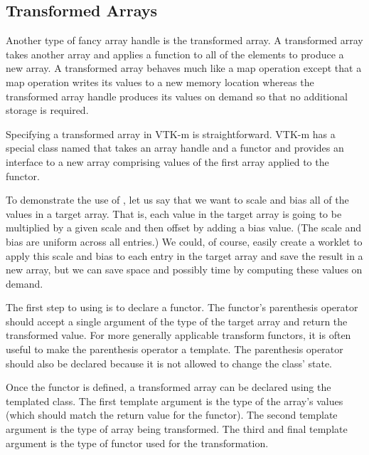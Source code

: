 
\subsection{Transformed Arrays}
\label{sec:TransformedArrays}


Another type of fancy array handle is the transformed array. A transformed
array takes another array and applies a function to all of the elements to
produce a new array. A transformed array behaves much like a map operation
except that a map operation writes its values to a new memory location
whereas the transformed array handle produces its values on demand so that
no additional storage is required.

Specifying a transformed array in VTK-m is straightforward. VTK-m has a
special class named  that takes an array
handle and a functor and provides an interface to a new array comprising
values of the first array applied to the functor.

To demonstrate the use of , let us say
that we want to scale and bias all of the values in a target array. That
is, each value in the target array is going to be multiplied by a given
scale and then offset by adding a bias value. (The scale and bias are
uniform across all entries.) We could, of course, easily create a worklet
to apply this scale and bias to each entry in the target array and save the
result in a new array, but we can save space and possibly time by computing
these values on demand.

The first step to using  is to declare
a functor. The functor's parenthesis operator should accept a single
argument of the type of the target array and return the transformed value.
For more generally applicable transform functors, it is often useful to
make the parenthesis operator a template. The parenthesis operator should
also be declared  because it is not allowed to change the
class' state.


Once the functor is defined, a transformed array can be declared using the
templated  class. The first template
argument is the type of the array's values (which should match the return
value for the functor). The second template argument is the type of array
being transformed. The third and final template argument is the type of
functor used for the transformation.

